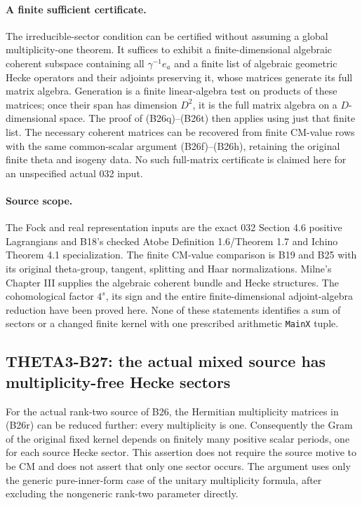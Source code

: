 \documentclass[11pt]{article}
\theoremstyle{definition}\newtheorem{definition}[theorem]{Definition}\newtheorem{remark}[theorem]{Remark}
\begin{document}
\paragraph{A finite sufficient certificate.}
The irreducible-sector condition can be certified without
assuming a global multiplicity-one theorem.  It suffices
to exhibit a finite-dimensional algebraic coherent
subspace containing all $\gamma^{-1}e_a$ and a finite
list of algebraic geometric Hecke operators and their
adjoints preserving it, whose matrices generate its full
matrix algebra.  Generation is a finite linear-algebra
test on products of these matrices; once their span has
dimension $D^2$, it is the full matrix algebra on a
$D$-dimensional space.  The proof of (B26q)--(B26t)
then applies using just that finite list.  The necessary
coherent matrices can be recovered from finite CM-value
rows with the same common-scalar argument (B26f)--(B26h),
retaining the original finite theta and isogeny data.
No such full-matrix certificate is claimed here for an
unspecified actual 032 input.

\paragraph{Source scope.}
The Fock and real representation inputs are the exact
032 Section 4.6 positive Lagrangians and B18's checked
Atobe Definition 1.6/Theorem 1.7 and Ichino Theorem 4.1
specialization.  The finite CM-value comparison is B19
and B25 with its original theta-group, tangent, splitting
and Haar normalizations.  Milne's Chapter III supplies
the algebraic coherent bundle and Hecke structures.
The cohomological factor $4^s$, its sign and the entire
finite-dimensional adjoint-algebra reduction have been
proved here.  None of these statements identifies a sum
of sectors or a changed finite kernel with one prescribed
arithmetic \texttt{MainX} tuple.


\subsection{THETA3-B27: the actual mixed source has multiplicity-free Hecke sectors}\label{B27}

For the actual rank-two source of B26, the Hermitian multiplicity
matrices in (B26r) can be reduced further: every multiplicity is one.
Consequently the Gram of the original fixed kernel depends on finitely
many positive scalar periods, one for each source Hecke sector.
This assertion does not require the source motive to be CM and does
not assert that only one sector occurs.  The argument uses only the
generic pure-inner-form case of the unitary multiplicity formula,
after excluding the nongeneric rank-two parameter directly.
\end{document}
